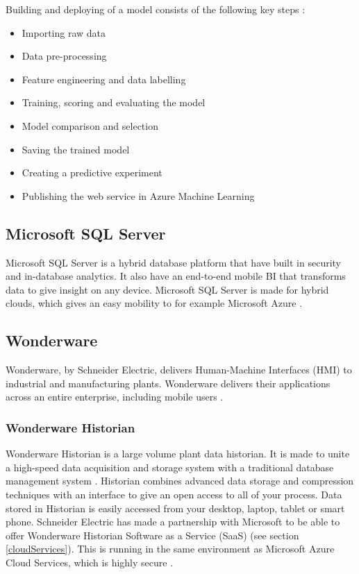 \documentclass[english, a4paper]{report}
\begin{document}
{{{{                Building and deploying of a model consists of the following key steps \cite{azurePredictive}:
            
                \begin{itemize}
                    \item Importing raw data
                    \item Data pre-processing
                    \item Feature engineering and data labelling
                    \item Training, scoring and evaluating the model
                    \item Model comparison and selection
                    \item Saving the trained model
                    \item Creating a predictive experiment
                    \item Publishing the web service in Azure Machine Learning
                \end{itemize}
            }
        }
        
        \subsection{Microsoft SQL Server}
        {
            Microsoft SQL Server is a hybrid database platform that have built in security and in-database analytics. It also have an end-to-end mobile BI that transforms data to give insight on any device. Microsoft SQL Server is made for hybrid clouds, which gives an easy mobility to for example Microsoft Azure \cite{aboutMicrosoftSQL}. 
        }
        
        \subsection{Wonderware}
        {
            Wonderware, by Schneider Electric, delivers Human-Machine Interfaces (HMI) to industrial and manufacturing plants. Wonderware delivers their applications across an entire enterprise, including mobile users \cite{aboutWonderware}. 
        }
        
            \subsubsection{Wonderware Historian}
            {
                Wonderware Historian is a large volume plant data historian. It is made to unite a high-speed data acquisition and storage system with a traditional database management system \cite{aboutWonderwareHistorian}. Historian combines advanced data storage and compression techniques with an interface to give an open access to all of your process. Data stored in Historian is easily accessed from your desktop, laptop, tablet or smart phone. Schneider Electric has made a partnership with Microsoft to be able to offer Wonderware Historian Software as a Service (SaaS) (see section \ref{cloudServices}). This is running in the same environment as Microsoft Azure Cloud Services, which is highly secure \cite{wonderwareHistorian}.
            }
            
}}
\end{document}
